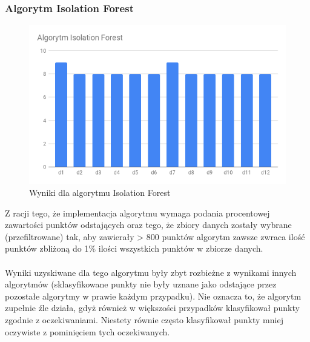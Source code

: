 \documentclass[eng,printmode]{mgr}
\begin{document}
\subsubsection{Algorytm Isolation Forest}
 \begin{figure}[H]
  \begin{center}
  \includegraphics[scale=0.7]{r_if}
  \end{center}
  \caption{Wyniki dla algorytmu Isolation Forest}
  \label{fig:r_if}
\end{figure}
Z racji tego, że implementacja algorytmu wymaga podania procentowej zawartości punktów odstających oraz tego, że zbiory danych zostały wybrane (przefiltrowane) tak, aby zawierały > 800 punktów algorytm zawsze zwraca ilość punktów zbliżoną do 1\% ilości wszystkich punktów w zbiorze danych.
\\\\
Wyniki uzyskiwane dla tego algorytmu były zbyt rozbieżne z wynikami innych algorytmów (sklasyfikowane punkty nie były uznane jako odstające przez pozostałe algorytmy w prawie każdym przypadku). Nie oznacza to, że algorytm zupełnie źle działa, gdyż również w większości przypadków klasyfikował punkty zgodnie z oczekiwaniami. Niestety równie często klasyfikował punkty mniej oczywiste z pominięciem tych oczekiwanych.
 
\end{document}
